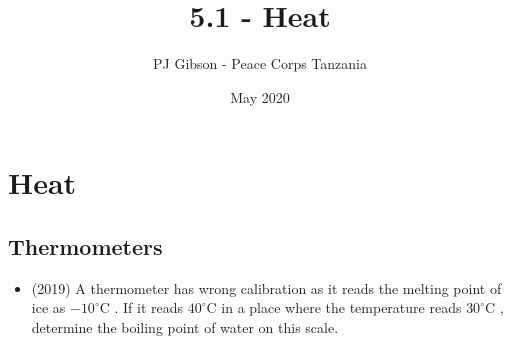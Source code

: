 \documentclass{article}
\title{5.1 - Heat}
\author{PJ Gibson - Peace Corps Tanzania}
\date{May 2020}
\begin{document}
\maketitle


\section{Heat}

\subsection{Thermometers}
\begin{itemize}
\item (2019)  A thermometer has wrong calibration as it reads the melting point of ice as $ -10^{\circ}$C . If it reads $ 40^{\circ}$C in a place where the temperature reads $ 30^{\circ}$C ,  determine the boiling point of water on this scale.
\end{itemize}
\end{document}
